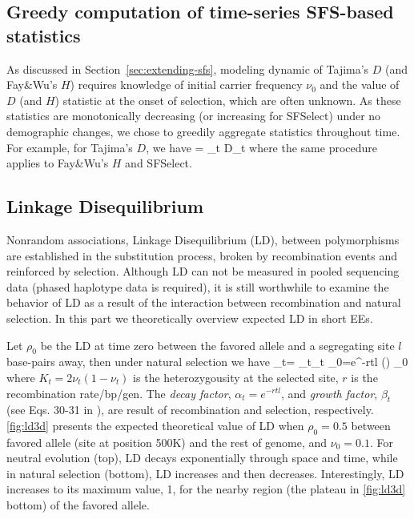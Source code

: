 \subsection{Greedy computation of time-series SFS-based  
statistics}\label{app:agg}
As discussed in Section~\ref{sec:extending-sfs}, modeling dynamic of
Tajima's $D$ (and Fay\&Wu's $H$) requires knowledge of initial carrier
frequency $\nu_0$ and the value of $D$ (and $H$) statistic at the
onset of selection, which are often unknown.  As these statistics are
monotonically decreasing (or increasing for SFSelect) under no
demographic changes, we chose to greedily aggregate statistics
throughout time. For example, for Tajima's $D$, we have \beq \Dc =
\sum_{t \in \Tc} D_t \eeq where the same procedure applies to
Fay\&Wu's $H$ and SFSelect.


\subsection{Linkage Disequilibrium}\label{app:ld}
Nonrandom associations, Linkage Disequilibrium (LD), between 
polymorphisms are established in the 
substitution process, broken by recombination events 
and reinforced by selection. 
Although LD can not be measured in pooled sequencing data (phased 
haplotype data is required), it is still worthwhile 
to examine the behavior of LD as a result of the interaction between 
recombination and natural selection. In this part we theoretically overview 
expected LD in short EEs.

Let $\rho_0$ be the LD at time zero between the favored allele and a 
segregating site $l$ base-pairs away, then under natural selection we have
\beq
\rho_t= \alpha_t\beta_t \rho_0=e^{-rtl} \left(\right)  
\rho_0\label{eq:ldt}
\eeq
where $K_t=2\nu_t(1-\nu_t)$ is the heterozygousity at the selected site, $r$ is 
the recombination rate/bp/gen. The 
\emph{decay factor}, $\alpha_t=e^{-rtl}$,
and \emph{growth factor}, $\beta_t$ (see Eqs. 30-31 in 
\cite{stephan2006hitchhiking}), are result of recombination and 
selection, respectively. \ref{fig:ld3d} presents the expected theoretical 
value of LD when $\rho_0=0.5$ between favored allele (site at position 500K) 
and the rest of 
genome, and $\nu_0=0.1$. For neutral evolution (top), LD decays exponentially 
through space and time, while in natural selection (bottom), LD increases and 
then decreases. Interestingly, LD increases to its maximum value, 1, for the 
nearby region (the plateau in \ref{fig:ld3d} bottom) of the favored 
allele.

